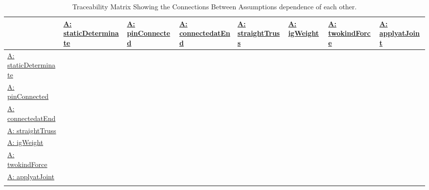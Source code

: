 \documentclass[12pt]{article}
\begin{document}
\begin{longtable}{l l l l l l l l}
\toprule
\textbf{} & \textbf{\hyperref[staticDeterminate]{A: staticDeterminate}} & \textbf{\hyperref[pinConnected]{A: pinConnected}} & \textbf{\hyperref[connectedatEnd]{A: connectedatEnd}} & \textbf{\hyperref[straightTruss]{A: straightTruss}} & \textbf{\hyperref[igWeight]{A: igWeight}} & \textbf{\hyperref[twokindForce]{A: twokindForce}} & \textbf{\hyperref[applyatJoint]{A: applyatJoint}}
\\
\midrule
\endhead
\hyperref[staticDeterminate]{A: staticDeterminate} &  &  &  &  &  &  & 
\\
\hyperref[pinConnected]{A: pinConnected} &  &  &  &  &  &  & 
\\
\hyperref[connectedatEnd]{A: connectedatEnd} &  &  &  &  &  &  & 
\\
\hyperref[straightTruss]{A: straightTruss} &  &  &  &  &  &  & 
\\
\hyperref[igWeight]{A: igWeight} &  &  &  &  &  &  & 
\\
\hyperref[twokindForce]{A: twokindForce} &  &  &  &  &  &  & 
\\
\hyperref[applyatJoint]{A: applyatJoint} &  &  &  &  &  &  & 
\\
\bottomrule
\caption{Traceability Matrix Showing the Connections Between Assumptions dependence of each other.}
\label{Table:TraceMatAvsA}
\end{longtable}
\end{document}

